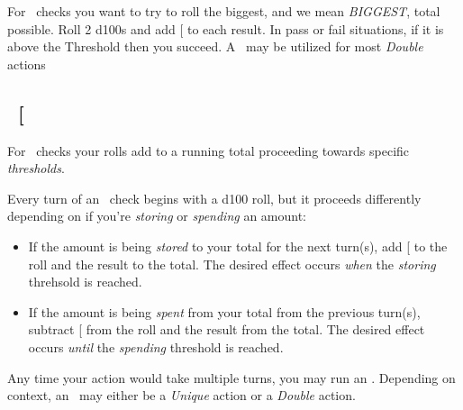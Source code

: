 \noindent For \POWEful\  checks you want to try to roll the biggest, and we mean \emph{BIGGEST}, total possible.
\noindent Roll 2 d100s and add {[}\POWE{]} to each result. In pass or fail situations, if it is above the Threshold then you succeed.
\fillrlinemid
\noindent A \POWE\ may be utilized for most \emph{Double} actions


\subsection{\ENDUful\ {[}\ENDU\index{\attribute!\ENDUful}{]}}


\noindent For \ENDUful\ checks your rolls add to a running total proceeding towards specific \textit{thresholds}.

\noindent Every turn of an \ENDU\ check begins with a d100 roll, but it proceeds differently depending on if you're \emph{storing} or \emph{spending} an amount:
\begin{itemize}
	\item If the amount is being \emph{stored} to your total for the next turn(s), add {[}\ENDU{]} to the roll and the result to the total. The desired effect occurs \emph{when} the \textit{storing} threhsold is reached.
	\item If the amount is being \emph{spent} from your total from the previous turn(s), subtract {[}\ENDU{]} from the roll and the result from the total. The desired effect occurs \emph{until} the \textit{spending} threshold is reached.
\end{itemize}

\fillrlinemid

\noindent Any time your action would take multiple turns, you may run an \ENDU. Depending on context, an \ENDU\  may either be a \emph{Unique} action or a \emph{Double} action.


\noindent {}

